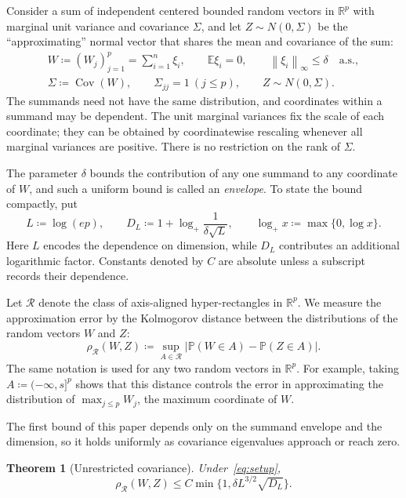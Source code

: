 \documentclass[11pt,letterpaper]{article}
\newtheorem{theorem}{Theorem}
\theoremstyle{remark}
\newcommand{\E}{\mathbb E}
\newcommand{\Pp}{\mathbb P}
\newcommand{\R}{\mathbb R}
\newcommand{\Cov}{\operatorname{Cov}}
\newcommand{\norm}[1]{\left\lVert#1\right\rVert}
\newcommand{\rh}{\rho_{\mathcal R}}
\begin{document}
Consider a sum of independent centered bounded random vectors in
\(\R^p\) with marginal unit variance and covariance \(\Sigma\), and let
\(Z\sim N(0,\Sigma)\) be the ``approximating'' normal vector that shares the
mean and covariance of the sum:
\begin{equation}
 \begin{gathered}
 W\coloneqq (W_j)_{j=1}^p=\sum_{i=1}^n\xi_i,\qquad
 \E\xi_i=0,\qquad \norm{\xi_i}_\infty\le\delta\quad\text{a.s.},\\
 \Sigma\coloneqq \Cov(W),\qquad\Sigma_{jj}=1\ (j\le p),
 \qquad Z\sim N(0,\Sigma).
 \end{gathered}
 \label{eq:setup}
\end{equation}
The summands need not have the same distribution, and coordinates within
a summand may be dependent. The unit marginal variances fix the scale
of each coordinate; they can be obtained by coordinatewise rescaling
whenever all marginal variances are positive. There is no
restriction on the rank of \(\Sigma\).

The parameter \(\delta\) bounds the contribution of any one summand
to any coordinate of \(W\), and such a uniform bound is called an
\emph{envelope}. To state the
bound compactly, put
\[
 L\coloneqq \log(ep),\qquad
 D_L\coloneqq 1+\log_+\frac1{\delta\sqrt L},\qquad
 \log_+x\coloneqq \max\{0,\log x\}.
\]
Here \(L\) encodes the dependence on dimension, while \(D_L\)
contributes an additional logarithmic factor. Constants denoted by
\(C\) are absolute unless a subscript records their dependence.

\indent
Let \(\mathcal R\) denote the class of axis-aligned hyper-rectangles in
\(\R^p\). We measure the approximation error by the Kolmogorov distance
between the distributions of the random vectors \(W\) and \(Z\):
\[
 \rh(W,Z)\coloneqq \sup_{A\in\mathcal R}
       |\Pp(W\in A)-\Pp(Z\in A)|.
\]
The same notation is used for any two random vectors in \(\R^p\). For
example, taking \(A\coloneqq (-\infty,s]^p\) shows that this distance controls the
error in approximating the distribution of \(\max_{j\le p}W_j\), the maximum
coordinate of \(W\).

The first bound of this paper depends only on the summand envelope and the
dimension, so it holds uniformly as covariance eigenvalues approach or
reach zero.

\begin{theorem}[Unrestricted covariance]\label{thm:unrestricted}
Under~\eqref{eq:setup},
\begin{equation}
 \rh(W,Z)\le C\min\{1,\delta L^{3/2}\sqrt{D_L}\}.
 \label{eq:unrestricted}
\end{equation}
\end{theorem}
\end{document}
